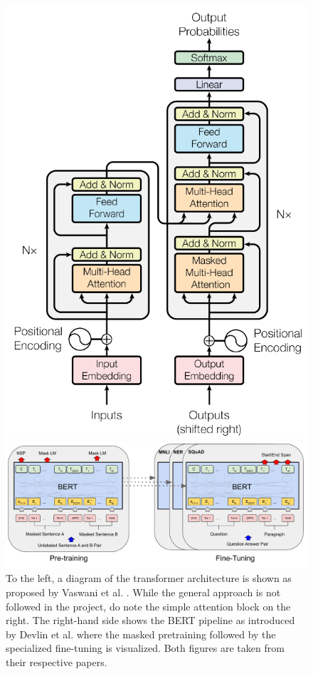 \documentclass[main.tex]{subfiles}
\begin{document}
\begin{figure}[H]
    \centering
    \begin{minipage}{0.29\linewidth}
        \includegraphics[width=\linewidth]{imgs/transformer}
    \end{minipage}\hfill
    \begin{minipage}{0.7\linewidth}
        \includegraphics[width=\linewidth]{imgs/bert}
    \end{minipage}
    \caption{
        To the left, a diagram of the transformer architecture is shown as proposed by Vaswani et al. \cite{vaswani2017att}.
        While the general approach is not followed in the project, do note the simple attention block on the right.
        The right-hand side shows the BERT pipeline as introduced by Devlin et al. \cite{devlin2019bert} where the masked pretraining followed by the specialized fine-tuning is visualized.
        Both figures are taken from their respective papers.
    }
    \label{fig:transformer-bert}
\end{figure}\noindent
\end{document}
